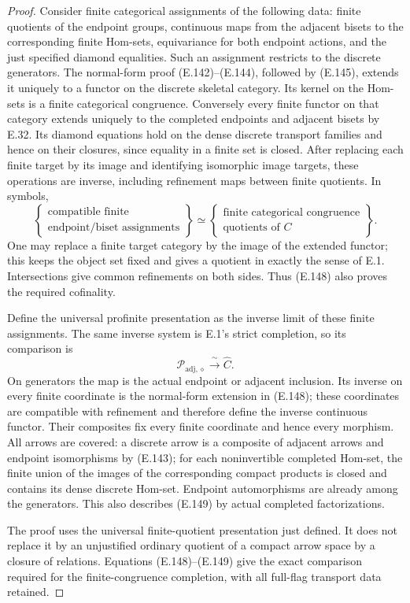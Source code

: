\begin{proof}
Consider finite categorical assignments of the following
data: finite quotients of the endpoint groups, continuous
maps from the adjacent bisets to the corresponding finite
Hom-sets, equivariance for both endpoint actions, and the
just specified diamond equalities.  Such an assignment
restricts to the discrete generators.  The normal-form
proof (E.142)--(E.144), followed by (E.145), extends it
uniquely to a functor on the discrete skeletal category.
Its kernel on the Hom-sets is a finite categorical
congruence.  Conversely every finite functor on that
category extends uniquely to the completed endpoints
and adjacent bisets by E.32.  Its diamond equations
hold on the dense discrete transport families and hence
on their closures, since equality in a finite set is
closed.  After replacing each finite target by its image and identifying
isomorphic image targets, these operations are inverse, including
refinement maps between finite quotients.  In symbols,
\[
 \left\{\begin{gathered}
 \text{compatible finite}\\
 \text{endpoint/biset assignments}
 \end{gathered}\right\}
 \simeq
 \left\{\begin{gathered}
 \text{finite categorical congruence}\\
 \text{quotients of }C
 \end{gathered}\right\}.
                                                               \tag{E.148}
\]
One may replace a finite target category by the image of
the extended functor; this keeps the object set fixed
and gives a quotient in exactly the sense of E.1.
Intersections give common refinements on both sides.
Thus (E.148) also proves the required cofinality.

Define the universal profinite presentation as the inverse
limit of these finite assignments.  The same inverse
system is E.1's strict completion, so its comparison is
\[
 \mathcal P_{\mathrm{adj},\diamond}
                  \xrightarrow{\ \sim\ }\widehat C.           \tag{E.149}
\]
On generators the map is the actual endpoint or adjacent
inclusion.  Its inverse on every finite coordinate is
the normal-form extension in (E.148); these coordinates
are compatible with refinement and therefore define
the inverse continuous functor.  Their composites fix
every finite coordinate and hence every morphism.
All arrows are covered: a discrete arrow is a composite
of adjacent arrows and endpoint isomorphisms by (E.143);
for each noninvertible completed Hom-set, the finite
union of the images of the corresponding compact
products is closed and contains its dense discrete
Hom-set.  Endpoint automorphisms are already among
the generators.  This also describes (E.149) by actual
completed factorizations.

The proof uses the universal finite-quotient presentation
just defined.  It does not replace it by an unjustified
ordinary quotient of a compact arrow space by a closure
of relations.  Equations (E.148)--(E.149) give the exact
comparison required for the finite-congruence completion,
with all full-flag transport data retained.
\end{proof}
